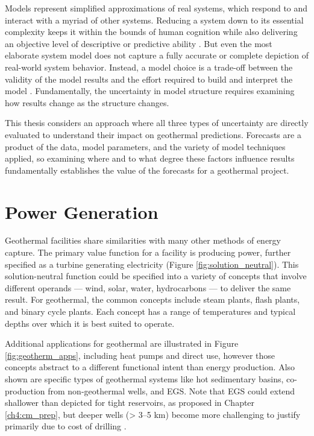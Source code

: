 Models represent simplified approximations of real systems, which respond to and interact with a myriad of other systems. Reducing a system down to its essential complexity keeps it within the bounds of human cognition while also delivering an objective level of descriptive or predictive ability \citep[p.\ 306]{crawley_system_2015}. But even the most elaborate system model does not capture a fully accurate or complete depiction of real-world system behavior. Instead, a model choice is a trade-off between the validity of the model results and the effort required to build and interpret the model \citep[p.\ 23]{morgan_best_2009}. Fundamentally, the uncertainty in model structure requires examining how results change as the structure changes.

This thesis considers an approach where all three types of uncertainty are directly evaluated to understand their impact on geothermal predictions. Forecasts are a product of the data, model parameters, and the variety of model techniques applied, so examining where and to what degree these factors influence results fundamentally establishes the value of the forecasts for a geothermal project.

\section{Power Generation}\label{ch2:power_gen}

Geothermal facilities share similarities with many other methods of energy capture. The primary value function for a facility is producing power, further specified as a turbine generating electricity (Figure \ref{fig:solution_neutral}). This solution-neutral function could be specified into a variety of concepts that involve different operands --- wind, solar, water, hydrocarbons --- to deliver the same result. For geothermal, the common concepts include steam plants, flash plants, and binary cycle plants. Each concept has a range of temperatures and typical depths over which it is best suited to operate.

Additional applications for geothermal are illustrated in Figure \ref{fig:geotherm_apps}, including heat pumps and direct use, however those concepts abstract to a different functional intent than energy production. Also shown are specific types of geothermal systems like hot sedimentary basins, co-production from non-geothermal wells, and EGS. Note that EGS could extend shallower than depicted for tight reservoirs, as proposed in Chapter \ref{ch4:cm_prep}, but deeper wells (> 3--5 km) become more challenging to justify primarily due to cost of drilling \citep{moore_more_2013}.

